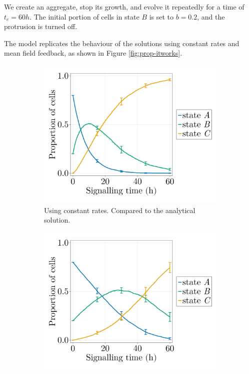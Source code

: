 We create an aggregate, stop its growth, and evolve it repeatedly for a time of $t_e=60h$. The initial portion of cells in state $B$ is set to $b=0.2$, and the protrusion is turned off.

The model replicates the behaviour of the solutions using constant rates and mean field feedback, as shown in Figure \ref{fig:prop-itworks}.

\begin{figure}[ht]
    \centering
    \begin{subfigure}{0.47\textwidth}
        \centering
        \includegraphics[width=\textwidth]{figures/405/405-proportions-simulation-constant-15ite.png}
        \caption{Using constant rates. Compared to the analytical solution.}
    \end{subfigure}
    \hfill
    \begin{subfigure}{0.47\textwidth}
        \centering
        \includegraphics[width=\textwidth]{figures/405/405-proportions-simulation-meanfield-15ite.png}

\end{subfigure}
\end{figure}
